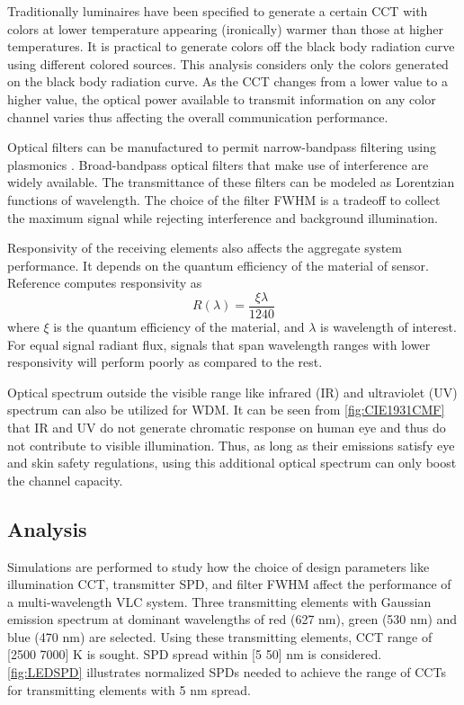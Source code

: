 Traditionally luminaires have been specified to generate a certain CCT with colors at lower temperature appearing (ironically) warmer than those at higher temperatures. It is practical to generate colors off the black body radiation curve using different colored sources. This analysis considers only the colors generated on the black body radiation curve. As the CCT changes from a lower value to a higher value, the optical power available to transmit information on any color channel varies thus affecting the overall communication performance.

Optical filters can be manufactured to permit narrow-bandpass filtering using plasmonics \cite{xu10a,yok12a}. Broad-bandpass optical filters that make use of interference are widely available. The transmittance of these filters can be modeled as Lorentzian functions of wavelength. The choice of the filter FWHM is a tradeoff to collect the maximum signal while rejecting interference and background illumination.

Responsivity of the receiving elements also affects the aggregate system performance. It depends on the quantum efficiency of the material of sensor. Reference \cite{gha12a} computes responsivity as
\begin{equation}
\label{eqResponsivity}
	 R(\lambda) = \frac{\xi\lambda}{1240}
\end{equation}
where $\xi$ is the quantum efficiency of the material, and $\lambda$ is wavelength of interest. For equal signal radiant flux, signals that span wavelength ranges with lower responsivity will perform poorly as compared to the rest. 

Optical spectrum outside the visible range like infrared (IR) and ultraviolet (UV) spectrum can also be utilized for WDM. It can be seen from \figurename{\ref{fig:CIE1931CMF}} that IR and UV do not generate chromatic response on human eye and thus do not contribute to visible illumination. Thus, as long as their emissions satisfy eye and skin safety regulations, using this additional optical spectrum can only boost the channel capacity.

\subsection{Analysis}
\label{subsec:wdmSystemAnalysis}
Simulations are performed to study how the choice of design parameters like illumination CCT, transmitter SPD, and filter FWHM affect the performance of a multi-wavelength VLC system. Three transmitting elements with Gaussian emission spectrum at dominant wavelengths of red (627 nm), green (530 nm) and blue (470 nm) are selected. Using these transmitting elements, CCT range of [2500 7000] K is sought. SPD spread within [5 50] nm is considered. \figurename{\ref{fig:LEDSPD}} illustrates normalized SPDs needed to achieve the range of CCTs for transmitting elements with 5 nm spread.

